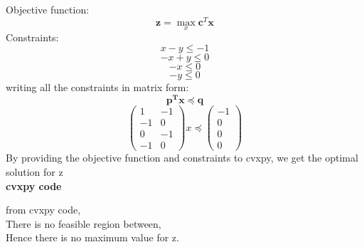 \documentclass[10pt, a4paper]{article}
\newcommand{\myvec}[1]{\ensuremath{\begin{pmatrix}#1\end{pmatrix}}}
\let\vec\mathbf
\begin{document}
Objective function:
\begin{equation}
	\vec{z} = \max_{x}\vec{c}^T\vec{x}
\end{equation}
Constraints:
\begin{equation}
x - y\le -1
\end{equation}
\begin{equation}
-x + y \le 0
\end{equation}
\begin{equation}
-x \le 0
\end{equation}
\begin{equation}
-y \le 0
\end{equation}
writing all the constraints in matrix form:
\begin{equation}
\vec{p^T}\vec{x} \preceq \vec{q}
\end{equation}
\begin{equation}
\myvec{1&-1 \\ -1&0 \\ 0&-1 \\ -1&0}x \preceq \myvec{-1 \\ 0 \\ 0 \\ 0 }
\end{equation}
By providing the objective function and constraints to cvxpy, we get the optimal solution for z
\\
\textbf{cvxpy code}

from cvxpy code,\\
There is no feasible region between,\\
Hence there is no maximum value for z.
\end{document}
